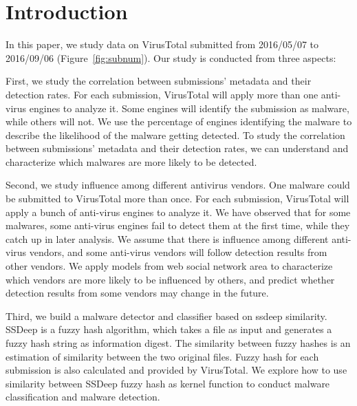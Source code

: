 \section{Introduction}
\label{sec:intro}

In this paper, we study data on VirusTotal submitted from 2016/05/07 to 2016/09/06 (Figure~\ref{fig:subnum}). 
Our study is conducted from three aspects:






First, we study the correlation between submissions' metadata and their detection rates. 
For each submission, VirusTotal will apply more than one anti-virus engines to analyze it. 
Some engines will identify the submission as malware, while others will not. 
We use the percentage of engines identifying the malware to describe the likelihood of the malware getting detected. 
To study the correlation between submissions' metadata and their detection rates, 
we can understand and characterize which malwares are more likely to be detected.   

Second, we study influence among different antivirus vendors. 
One malware could be submitted to VirusTotal more than once. 
For each submission, VirusTotal will apply a bunch of anti-virus engines to analyze it.
We have observed that for some malwares, some anti-virus engines fail to detect them at the first time, while they catch up in later analysis. 
We assume that there is influence among different anti-virus vendors, 
and some anti-virus vendors will follow detection results from other vendors. 
We apply models from web social network area to characterize 
which vendors are more likely to be influenced by others, 
and predict whether detection results from some vendors may change in the future.  

Third, we build a malware detector and classifier based on ssdeep similarity. 
SSDeep is a fuzzy hash algorithm, which takes a file as input and generates a fuzzy hash string as information digest. 
The similarity between fuzzy hashes is an estimation of similarity between the two original files. 
Fuzzy hash for each submission is also calculated and provided by VirusTotal. 
We explore how to use similarity between SSDeep fuzzy hash as 
kernel function to conduct malware classification and malware detection. 